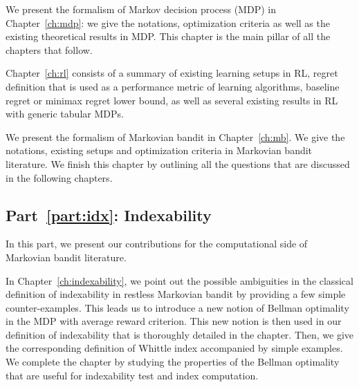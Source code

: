 We present the formalism of Markov decision process (MDP) in Chapter~\ref{ch:mdp}: we give the notations, optimization criteria as well as the existing theoretical results in MDP.
This chapter is the main pillar of all the chapters that follow.

Chapter~\ref{ch:rl} consists of a summary of existing learning setups in RL, regret definition that is used as a performance metric of learning algorithms, baseline regret or minimax regret lower bound, as well as several existing results in RL with generic tabular MDPs.

We present the formalism of Markovian bandit in Chapter~\ref{ch:mb}. We give the notations, existing setups and optimization criteria in Markovian bandit literature.
We finish this chapter by outlining all the questions that are discussed in the following chapters.

\subsection{Part~{\ref{part:idx}}: Indexability}

In this part, we present our contributions for the computational side of Markovian bandit literature.

In Chapter~\ref{ch:indexability}, we point out the possible ambiguities in the classical definition of indexability in restless Markovian bandit by providing a few simple counter-examples.
This leads us to introduce a new notion of Bellman optimality in the MDP with average reward criterion.
This new notion is then used in our definition of indexability that is thoroughly detailed in the chapter.
Then, we give the corresponding definition of Whittle index accompanied by simple examples.
We complete the chapter by studying the properties of the Bellman optimality that are useful for indexability test and index computation.

